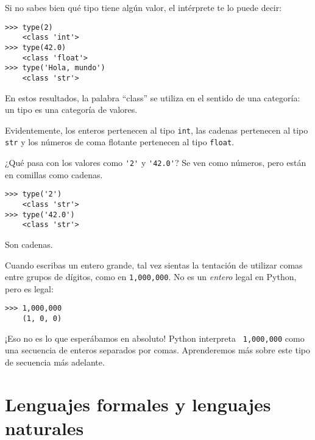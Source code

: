 \documentclass[10pt]{book}
\begin{document}
Si no sabes bien qué tipo tiene algún valor, el intérprete te lo
puede decir:

\begin{verbatim}
>>> type(2)
    <class 'int'>
>>> type(42.0)
    <class 'float'>
>>> type('Hola, mundo')
    <class 'str'>
\end{verbatim}
%
En estos resultados, la palabra ``class'' se utiliza en el sentido de
una categoría: un tipo es una categoría de valores.

Evidentemente, los enteros pertenecen al tipo {\tt int},
las cadenas pertenecen al tipo {\tt str} y los números de
coma flotante pertenecen al tipo {\tt float}.

¿Qué pasa con los valores como \verb"'2'" y \verb"'42.0'"?
Se ven como números, pero están en comillas como
cadenas.

\begin{verbatim}
>>> type('2')
    <class 'str'>
>>> type('42.0')
    <class 'str'>
\end{verbatim}
%
Son cadenas.

Cuando escribas un entero grande, tal vez sientas la tentación de utilizar comas
entre grupos de dígitos, como en {\tt 1,000,000}.  No es un
{\em entero} legal en Python, pero es legal:

\begin{verbatim}
>>> 1,000,000
    (1, 0, 0)
\end{verbatim}
%
¡Eso no es lo que esperábamos en absoluto!  Python interpreta {\tt
  1,000,000} como una secuencia de enteros separados por comas.  Aprenderemos
más sobre este tipo de secuencia más adelante.




\section{Lenguajes formales y lenguajes naturales}
\end{document}

